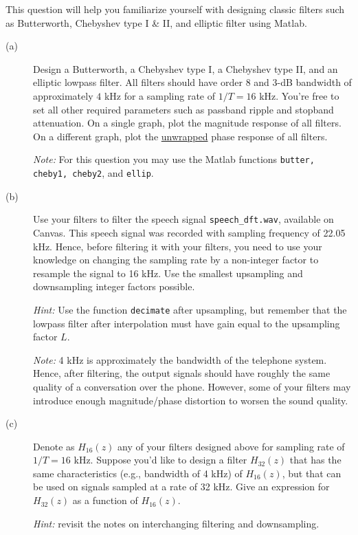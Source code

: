 \documentclass[12pt]{report}
\begin{document}
This question will help you familiarize yourself with designing classic filters such as Butterworth, Chebyshev type I \& II, and elliptic filter using Matlab. 
\begin{description}
	\item[(a)] Design a Butterworth, a Chebyshev type I, a Chebyshev type II, and an elliptic lowpass filter. All filters should have order 8 and 3-dB bandwidth of approximately $4$ kHz for a sampling rate of $1/T = 16$ kHz. You're free to set all other required parameters such as passband ripple and stopband attenuation. On a single graph, plot the magnitude response of all filters. On a different graph, plot the \underline{unwrapped} phase response of all filters.
	
	\textit{Note:} For this question you may use the Matlab functions \texttt{butter, cheby1, cheby2}, and \texttt{ellip}.  
	
	\item[(b)] Use your filters to filter the speech signal \texttt{speech\_dft.wav}, available on Canvas. This speech signal was recorded with sampling frequency of 22.05 kHz. Hence, before filtering it with your filters, you need to use your knowledge on changing the sampling rate by a non-integer factor to resample the signal to 16 kHz. Use the smallest upsampling and downsampling integer factors possible.
	 
	\textit{Hint:} Use the function \texttt{decimate} after upsampling, but remember that the lowpass filter after interpolation must have gain equal to the upsampling factor $L$.
	
	\textit{Note:} 4 kHz is approximately the bandwidth of the telephone system. Hence, after filtering, the output signals should have roughly the same quality of a conversation over the phone. However, some of your filters may introduce enough magnitude/phase distortion to worsen the sound quality.
	
	\item[(c)] Denote as $H_{16}(z)$ any of your filters designed above for sampling rate of $1/T = 16$ kHz. Suppose
	you'd like to design a filter $H_{32}(z)$ that has the same characteristics (e.g., bandwidth of 4 kHz) of $H_{16}(z)$, but that can be used on signals sampled at a rate of 32 kHz. Give an expression for $H_{32}(z)$ as a function of $H_{16}(z)$.
	
	\textit{Hint:} revisit the notes on interchanging filtering and downsampling.
\end{description}
\end{document}
